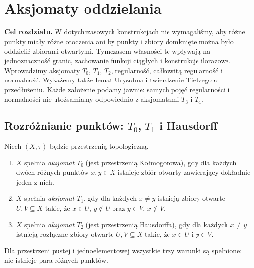 \chapter{Aksjomaty oddzielania}
\label{ch:topog-oddzielanie}

\noindent\textbf{Cel rozdziału.}
W dotychczasowych konstrukcjach nie wymagaliśmy, aby różne punkty
miały różne otoczenia ani by punkty i zbiory domknięte można było
oddzielić zbiorami otwartymi. Tymczasem własności te wpływają na
jednoznaczność granic, zachowanie funkcji ciągłych i konstrukcje ilorazowe.
Wprowadzimy aksjomaty $T_0$, $T_1$, $T_2$, regularność, całkowitą
regularność i normalność. Wykażemy także lemat Urysohna
i twierdzenie Tietzego o przedłużeniu. Każde założenie podamy jawnie: samych pojęć
regularności i normalności nie utożsamiamy odpowiednio z aksjomatami
$T_3$ i $T_4$.

\section{Rozróżnianie punktów: $T_0$, $T_1$ i Hausdorff}
\label{sec:topog-t0-t1-t2}

\begin{definicja}[Aksjomaty $T_0$, $T_1$, $T_2$]
\label{def:topog-t0-t1-t2}
Niech $(X,\tau)$ będzie przestrzenią topologiczną.
\begin{enumerate}[label=(\roman*)]
\item $X$ spełnia \emph{aksjomat $T_0$} (jest przestrzenią
Kołmogorowa), gdy dla każdych dwóch różnych punktów $x,y\in X$
istnieje zbiór otwarty zawierający dokładnie jeden z nich.
\item $X$ spełnia \emph{aksjomat $T_1$}, gdy dla każdych $x\ne y$
istnieją zbiory otwarte $U,V\subseteq X$ takie, że
$x\in U$, $y\notin U$ oraz $y\in V$, $x\notin V$.
\item $X$ spełnia \emph{aksjomat $T_2$} (jest przestrzenią
Hausdorffa), gdy dla każdych $x\ne y$ istnieją rozłączne
zbiory otwarte $U,V\subseteq X$ takie, że $x\in U$ i $y\in V$.
\end{enumerate}
Dla przestrzeni pustej i jednoelementowej wszystkie trzy warunki
są spełnione: nie istnieje para różnych punktów.
\end{definicja}


